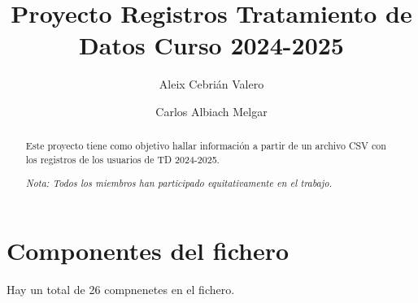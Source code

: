 \documentclass[]{elsarticle} %
\newenvironment{Shaded}{\begin{snugshade}}{\end{snugshade}}
\newcommand{\AttributeTok}[1]{\textcolor[rgb]{0.13,0.29,0.53}{#1}}
\newcommand{\ConstantTok}[1]{\textcolor[rgb]{0.56,0.35,0.01}{#1}}
\newcommand{\DecValTok}[1]{\textcolor[rgb]{0.00,0.00,0.81}{#1}}
\newcommand{\FunctionTok}[1]{\textcolor[rgb]{0.13,0.29,0.53}{\textbf{#1}}}
\newcommand{\NormalTok}[1]{#1}
\newcommand{\OtherTok}[1]{\textcolor[rgb]{0.56,0.35,0.01}{#1}}
\newcommand{\SpecialCharTok}[1]{\textcolor[rgb]{0.81,0.36,0.00}{\textbf{#1}}}
\newcommand{\StringTok}[1]{\textcolor[rgb]{0.31,0.60,0.02}{#1}}
\begin{document}
\begin{frontmatter}

  \title{Proyecto Registros Tratamiento de Datos Curso 2024-2025}
    \author[a]{Aleix Cebrián Valero%
  }
  
    \author[b]{Carlos Albiach Melgar%
  }
  
  
  \begin{abstract}
  Este proyecto tiene como objetivo hallar información a partir de un
  archivo CSV con los registros de los usuarios de TD 2024-2025.

  \emph{Nota: Todos los miembros han participado equitativamente en el
  trabajo.}
  \end{abstract}
  
 \end{frontmatter}

\newpage

\section{Componentes del fichero}\label{componentes-del-fichero}

Hay un total de 26 compnenetes en el fichero.

\begin{Shaded}
\end{Shaded}
\end{document}
